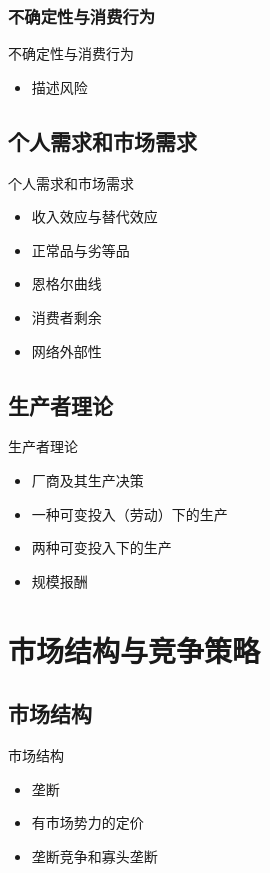 \documentclass[UTF8]{ctexbeamer}
\begin{document}
\subsubsection{不确定性与消费行为}
\begin{frame}{不确定性与消费行为}
\begin{itemize}
\item 描述风险
\end{itemize}
\end{frame}

\subsection{个人需求和市场需求}
\begin{frame}{个人需求和市场需求}
\begin{itemize}
\item 收入效应与替代效应
\item 正常品与劣等品
\item 恩格尔曲线
\item 消费者剩余
\item 网络外部性
\end{itemize}
\end{frame}


\subsection{生产者理论}
\begin{frame}{生产者理论}
\begin{itemize}
\item 厂商及其生产决策
\item 一种可变投入（劳动）下的生产
\item 两种可变投入下的生产
\item 规模报酬
\end{itemize}
\end{frame}

\section{市场结构与竞争策略}

\subsection{市场结构}
\begin{frame}{市场结构}
\begin{itemize}
\item 垄断
\item 有市场势力的定价
\item 垄断竞争和寡头垄断
\end{itemize}
\end{frame}
\end{document}
